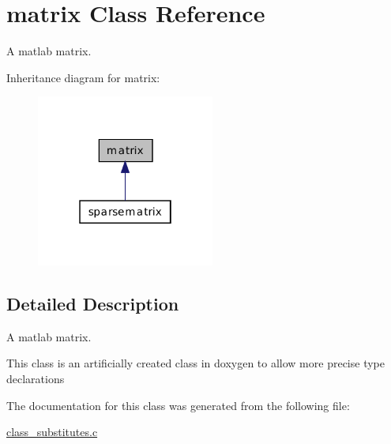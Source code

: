 \hypertarget{classmatrix}{\section{matrix Class Reference}
\label{classmatrix}
}


A matlab matrix.  




Inheritance diagram for matrix\-:\nopagebreak
\begin{figure}[H]
\begin{center}
\leavevmode
\includegraphics[width=166pt]{classmatrix__inherit__graph}
\end{center}
\end{figure}


\subsection{Detailed Description}
A matlab matrix. 

This class is an artificially created class in doxygen to allow more precise type declarations 

The documentation for this class was generated from the following file\-:\begin{DoxyCompactItemize}
\item 
\hyperlink{class__substitutes_8c}{class\-\_\-substitutes.\-c}\end{DoxyCompactItemize}
